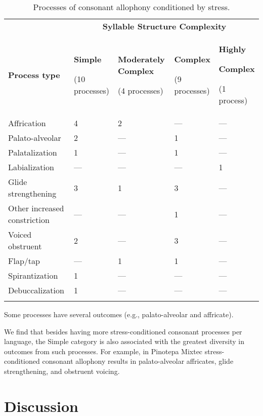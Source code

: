 \begin{table}
\begin{tabularx}{\textwidth}{XXXXX}
\lsptoprule
 & \multicolumn{4}{c}{ \textbf{Syllable Structure Complexity}}\\
 \textbf{Process type} & { \textbf{Simple}}

 (10 processes) & { \textbf{Moderately Complex}}

 (4 processes) & { \textbf{Complex}}

 (9 processes) & { \textbf{Highly} }

{ \textbf{Complex}}

 (1 process)\\
 Affrication & 4 & 2 & — & —\\
 Palato-alveolar & 2 & — & 1 & —\\
 Palatalization & 1 & — & 1 & —\\
 Labialization & — & — & — & 1\\
 Glide strengthening & 3 & 1 & 3 & —\\
 Other increased constriction & — & — & 1 & —\\
 Voiced obstruent & 2 & — & 3 & —\\
 Flap/tap & — & 1 & 1 & —\\
 Spirantization & 1 & — & — & —\\
 Debuccalization & 1 & — & — & —\\
\lspbottomrule
\end{tabularx}
\caption{\label{tab:7.9}Processes of consonant allophony conditioned by stress.}Some processes have several outcomes (e.g., palato-alveolar and affricate).
\end{table}

  We find that besides having more stress-conditioned consonant processes per language, the Simple category is also associated with the greatest diversity in outcomes from such processes. For example, in Pinotepa Mixtec stress-conditioned consonant allophony results in palato-alveolar affricates, glide strengthening, and obstruent voicing.

\section{Discussion}\label{sec:7.4}


